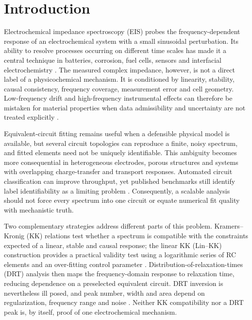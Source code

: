 \documentclass[a4paper,fleqn]{cas-sc}
\begin{document}
\section{Introduction}\label{sec:introduction}

Electrochemical impedance spectroscopy (EIS) probes the frequency-dependent
response of an electrochemical system with a small sinusoidal perturbation. Its
ability to resolve processes occurring on different time scales has made it a
central technique in batteries, corrosion, fuel cells, sensors and interfacial
electrochemistry \cite{Wang2021EIS,Boukamp2025Guidance}. The measured complex
impedance, however, is not a direct label of a physicochemical mechanism. It is
conditioned by linearity, stability, causal consistency, frequency coverage,
measurement error and cell geometry. Low-frequency drift and high-frequency
instrumental effects can therefore be mistaken for material properties when
data admissibility and uncertainty are not treated explicitly
\cite{Wang2021EIS,Boukamp2025Guidance}.

Equivalent-circuit fitting remains useful when a defensible physical model is
available, but several circuit topologies can reproduce a finite, noisy
spectrum, and fitted elements need not be uniquely identifiable. This ambiguity
becomes more consequential in heterogeneous electrodes, porous structures and
systems with overlapping charge-transfer and transport responses. Automated
circuit classification can improve throughput, yet published benchmarks still
identify label identifiability as a limiting problem \cite{Schaeffer2023AutoECM}.
Consequently, a scalable analysis should not force every spectrum into one
circuit or equate numerical fit quality with mechanistic truth.

Two complementary strategies address different parts of this problem.
Kramers--Kronig (KK) relations test whether a spectrum is compatible with the
constraints expected of a linear, stable and causal response; the linear KK
(Lin--KK) construction provides a practical validity test using a logarithmic
series of RC elements and an over-fitting control parameter
\cite{Schonleber2014LinKK}. Distribution-of-relaxation-times (DRT) analysis then
maps the frequency-domain response to relaxation time, reducing dependence on a
preselected equivalent circuit. DRT inversion is nevertheless ill posed, and
peak number, width and area depend on regularization, frequency range and noise
\cite{CiucciChen2015DRT,BoukampRolle2017DRT}. Neither KK compatibility nor a DRT
peak is, by itself, proof of one electrochemical mechanism.
\end{document}

